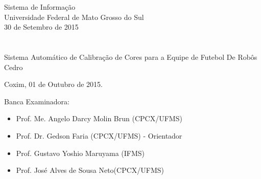 \vskip 0.5cm
\begin{center}
Sistema de Informação\\
Universidade Federal de Mato Grosso do Sul\\
30 de Setembro de 2015
\end{center}


\chapter*{}

\begin{center}

\begin{minipage}[t]{10cm}
	\begin{center}
		\vspace{-2cm}
		{{\Large Sistema Automático de Calibração de Cores para a Equipe de Futebol De Robôs Cedro}}  
	\end{center}
\end{minipage}

\end{center}


\begin{flushright}
	\vspace{12cm}
	Coxim, 01 de Outubro de 2015.
\end{flushright}

\vspace{2cm}
Banca Examinadora:

\begin{itemize}
	\item Prof. Me. Angelo Darcy Molin Brun (CPCX/UFMS) 
	\item Prof. Dr. Gedson Faria (CPCX/UFMS) - Orientador
	\item Prof. Gustavo Yoshio Maruyama (IFMS)
	\item Prof. José Alves de Sousa Neto(CPCX/UFMS)
\end{itemize}
